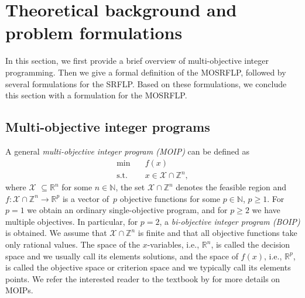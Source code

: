 \documentclass{article}
\newcommand{\SRFLP}{SRFLP\xspace}
\newcommand{\MOSRFLP}{MOSRFLP\xspace}
\begin{document}
\section{Theoretical background and problem formulations}\label{sec:background} 
In this section, we first provide a brief overview of multi-objective integer programming. Then we give a formal definition of the \MOSRFLP, followed by several formulations for the \SRFLP. Based on these formulations, we conclude this section with a formulation for the \MOSRFLP.

\subsection{Multi-objective integer programs}\label{sec:MOIP}
A general \emph{multi-objective integer program (MOIP)} can be defined as 
\begin{equation*}    
    \begin{aligned}
        \min \quad & f(x)\\
        \text{s.t.} \quad  &x \in \mathcal{X} \cap \mathbb Z^n,
    \end{aligned}
\end{equation*}
where $\mathcal{X}$ $\subseteq \mathbb{R}^n$ for some $n \in \mathbb N$, the set $\mathcal{X} \cap \mathbb Z^n$ denotes the feasible region and
$f: \mathcal{X} \cap \mathbb Z^n \to \mathbb{R}^p$ is a vector of~$p$ objective functions for some
$p \in \mathbb{N}$, $p\geq 1$. For $p=1$ we obtain an ordinary single-objective program, and for $p\geq 2$ we have multiple objectives. In particular, for $p=2$, a \emph{bi-objective integer program (BOIP)} is obtained. We assume that $\mathcal{X}\cap \mathbb Z^n$ is finite and that all objective functions take only rational values.  
The space of the $x$-variables, i.e., $\mathbb R^n$, is called the decision space and we usually call its elements solutions, and the space of $f(x)$, i.e., $\mathbb R^p$, is called the objective space or criterion space and we typically call its elements points. 
We refer the interested reader to the textbook by \citet{Ehrgott2005} for more details on MOIPs.
\end{document}
